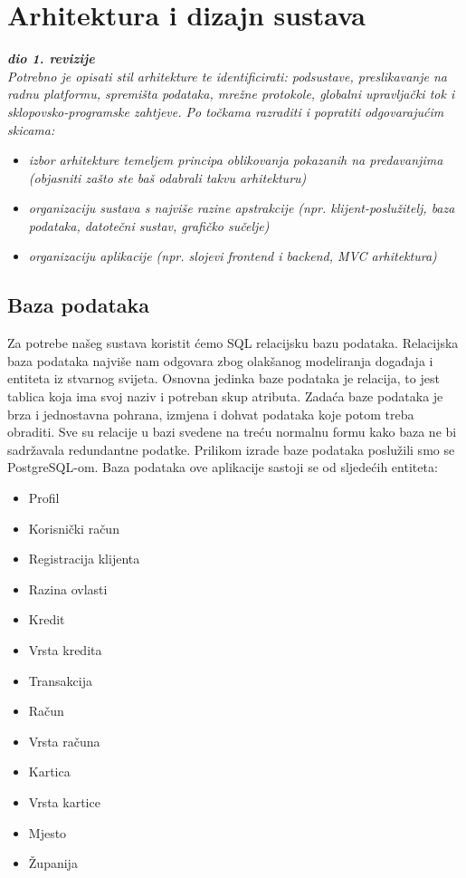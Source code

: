 \chapter{Arhitektura i dizajn sustava}

		
		\textbf{\textit{dio 1. revizije}}\\

		\textit{ Potrebno je opisati stil arhitekture te identificirati: podsustave, preslikavanje na radnu platformu, spremišta podataka, mrežne protokole, globalni upravljački tok i sklopovsko-programske zahtjeve. Po točkama razraditi i popratiti odgovarajućim skicama:}
	\begin{itemize}
		\item 	\textit{izbor arhitekture temeljem principa oblikovanja pokazanih na predavanjima (objasniti zašto ste baš odabrali takvu arhitekturu)}
		\item 	\textit{organizaciju sustava s najviše razine apstrakcije (npr. klijent-poslužitelj, baza podataka, datotečni sustav, grafičko sučelje)}
		\item 	\textit{organizaciju aplikacije (npr. slojevi frontend i backend, MVC arhitektura) }		
	\end{itemize}

	
		

		\eject

				
		\section{Baza podataka}
			
			
		Za potrebe našeg sustava koristit ćemo SQL relacijsku bazu podataka. Relacijska baza podataka najviše nam odgovara zbog olakšanog modeliranja događaja i entiteta iz stvarnog svijeta. Osnovna jedinka baze podataka je relacija, to jest tablica koja ima svoj naziv i potreban skup atributa. Zadaća baze podataka je brza i jednostavna pohrana, izmjena i dohvat podataka koje potom treba obraditi. Sve su relacije u bazi svedene na treću normalnu formu kako baza ne bi sadržavala redundantne podatke. Prilikom izrade baze podataka poslužili smo se PostgreSQL-om.
		Baza podataka ove aplikacije sastoji se od sljedećih entiteta:
		\begin{itemize}
			\item 	Profil
			\item 	Korisnički račun
			\item 	Registracija klijenta
			\item   Razina ovlasti
			\item   Kredit
			\item   Vrsta kredita
			\item   Transakcija
			\item   Račun
			\item   Vrsta računa
			\item   Kartica
			\item   Vrsta kartice	
			\item   Mjesto
			\item   Županija	
		\end{itemize}
		
